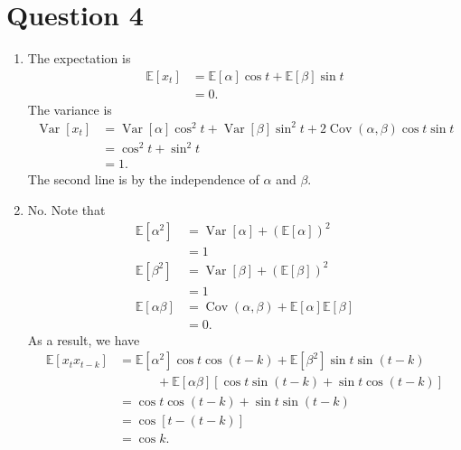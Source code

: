 \documentclass[12pt]{article}
\begin{document}
\section*{Question 4}
\begin{enumerate}[label=\alph*.]
   \item The expectation is
   \begin{align*}
      \mathbb{E}[x_t] &= \mathbb{E}[\alpha] \cos t + \mathbb{E}[\beta] \sin t\\
      & = 0.
   \end{align*}
   The variance is
   \begin{align*}
      \operatorname{Var}[x_t] &= \operatorname{Var}[\alpha] \cos^2 t + \operatorname{Var}[\beta] \sin^2 t + 2 \operatorname{Cov}(\alpha, \beta) \cos t \sin t\\
      & = \cos^2 t + \sin^2 t\\
      & = 1.
   \end{align*}
   The second line is by the independence of $\alpha$ and $\beta$.

   \item No. Note that
   \begin{align*}
      \mathbb{E}[\alpha^2] &= \operatorname{Var}[\alpha] + \left(\mathbb{E}[\alpha]\right)^2\\
      &= 1\\
      \mathbb{E}[\beta^2] &= \operatorname{Var}[\beta] + \left(\mathbb{E}[\beta]\right)^2\\
      &= 1\\
      \mathbb{E}[\alpha \beta] &= \operatorname{Cov}(\alpha, \beta) + \mathbb{E}[\alpha] \mathbb{E}[\beta]\\
      &= 0.
   \end{align*}
   As a result, we have
   \begin{align*}
      \mathbb{E}[x_t x_{t-k}] &= \mathbb{E}[\alpha^2] \cos t \cos (t-k) + \mathbb{E}[\beta^2] \sin t \sin (t-k)\\
      &\qquad \quad + \mathbb{E}[\alpha \beta] [\cos t \sin (t-k) + \sin t \cos (t-k)]\\
      &= \cos t \cos (t-k) + \sin t \sin (t-k)\\
      &= \cos [t-(t-k)]\\
      &= \cos k.
   \end{align*}
\end{enumerate}
\end{document}
